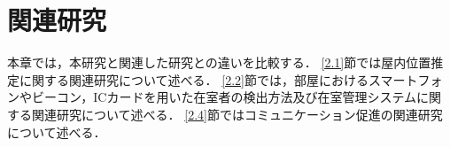 \chapter{関連研究}\label{2}

本章では，本研究と関連した研究との違いを比較する．
\ref{2.1}節では屋内位置推定に関する関連研究について述べる．
\ref{2.2}節では，部屋におけるスマートフォンやビーコン，ICカードを用いた在室者の検出方法及び在室管理システムに関する関連研究について述べる．
\ref{2.4}節ではコミュニケーション促進の関連研究について述べる．



% 



